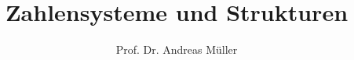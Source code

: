 %
%
%


\beamertemplatenavigationsymbolsempty
\title[Einführung]{Zahlensysteme und Strukturen}
\author[A.~Müller]{Prof. Dr. Andreas Müller}
\date[]{}

